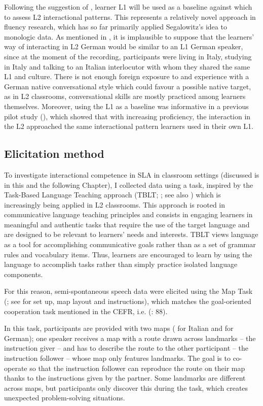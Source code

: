 Following the suggestion of \citet{Segalowitz2016}, learner L1 will be used as a baseline against which to assess L2 interactional patterns. This represents a relatively novel approach in fluency research, which has so far primarily applied Segalowitz’s idea to monologic data. As mentioned in , it is implausible to suppose that the learners’ way of interacting in L2 German would be similar to an L1 German speaker, since at the moment of the recording, participants were living in Italy, studying in Italy and talking to an Italian interlocutor with whom they shared the same L1 and culture. There is not enough foreign exposure to and experience with a German native conversational style which could favour a possible native target, as in L2 classrooms, conversational skills are mostly practiced among learners themselves. Moreover, using the L1 as a baseline was informative in a previous pilot study (\citealt{SbrannaEtAl2020}), which showed that with increasing proficiency, the interaction in the L2 approached the same interactional pattern learners used in their own L1. 

\subsection{Elicitation method}
\label{sec:3.2.2}
To investigate interactional competence in SLA in classroom settings (discussed is in this and the following Chapter), I collected data using a task, inspired by the Task-Based Language Teaching approach (TBLT; \citealt{Long1985,Long2015}; see also \citealt{GassMackey2014}) which is increasingly being applied in L2 classrooms. This approach is rooted in communicative language teaching principles and consists in engaging learners in meaningful and authentic tasks that require the use of the target language and are designed to be relevant to learners' needs and interests. TBLT views language as a tool for accomplishing communicative goals rather than as a set of grammar rules and vocabulary items. Thus, learners are encouraged to learn by using the language to accomplish tasks rather than simply practice isolated language components.

For this reason, semi-spontaneous speech data were elicited using the Map Task (\citealt{AndersonEtAl1991}; see \citealt{GriceSavino2003} for set up, map layout and instructions), which matches the goal-oriented cooperation task mentioned in the CEFR, i.e. (\citealt{PiccardoEtAl2018}: 88). 

In this task, participants are provided with two maps ( for Italian and  for German); one speaker receives a map with a route drawn across landmarks – the instruction giver – and has to describe the route to the other participant – the instruction follower – whose map only features landmarks. The goal is to co-operate so that the instruction follower can reproduce the route on their map thanks to the instructions given by the partner. Some landmarks are different across maps, but participants only discover this during the task, which creates unexpected problem-solving situations. 

